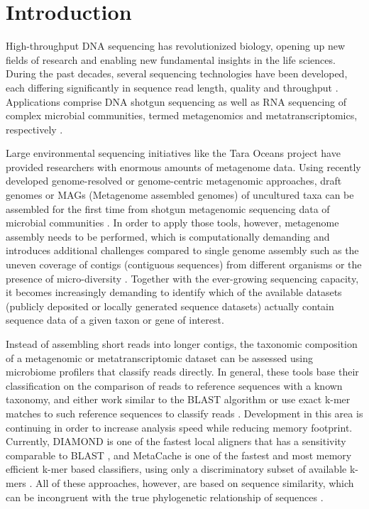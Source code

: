 \documentclass[a4paper]{article}
\begin{document}
\section{Introduction}
High-throughput DNA sequencing has revolutionized biology, opening up new fields of research and enabling new fundamental insights in the life sciences. During the past decades, several sequencing technologies have been developed, each differing significantly in sequence read length, quality and throughput \citep{Mardis2017}. Applications comprise DNA shotgun sequencing as well as RNA sequencing of complex microbial communities, termed metagenomics and metatranscriptomics, respectively \citep{Mitchell2018}. 

Large environmental sequencing initiatives like the Tara Oceans project \citep{Sunagawa2015} have provided researchers with enormous amounts of metagenome data. Using recently developed genome-resolved or genome-centric metagenomic approaches, draft genomes or MAGs (Metagenome assembled genomes) of uncultured taxa can be assembled for the first time from shotgun metagenomic sequencing data of microbial communities \citep{Alneberg2014,Eren2015}. In order to apply those tools, however, metagenome assembly needs to be performed, which is computationally demanding and introduces additional challenges compared to single genome assembly such as the uneven coverage of contigs (contiguous sequences) from different organisms or the presence of micro-diversity \citep{Quince2017}. Together with the ever-growing sequencing capacity, it becomes increasingly demanding to identify which of the available datasets (publicly deposited or locally generated sequence datasets) actually contain sequence data of a given taxon or gene of interest.

Instead of assembling short reads into longer contigs, the taxonomic composition of a metagenomic or metatranscriptomic dataset can be assessed using microbiome profilers that classify reads directly. In general, these tools base their classification on the comparison of reads to reference sequences with a known taxonomy, and either work similar to the BLAST algorithm \citep[e.g. ][]{Huson2016,Truong2015} or use exact k-mer matches to such reference sequences to classify reads \citep[e.g. ][]{Ounit2015,Wood2014}. Development in this area is continuing in order to increase analysis speed while reducing memory footprint. Currently, DIAMOND is one of the fastest local aligners that has a sensitivity comparable to BLAST \citep{Buchfink2014}, and MetaCache is one of the fastest and most memory efficient k-mer based classifiers, using only a discriminatory subset of available k-mers \citep{Muller2017}. All of these approaches, however, are based on sequence similarity, which can be incongruent with the true phylogenetic relationship of sequences \citep{Smith2017}.
\end{document}
